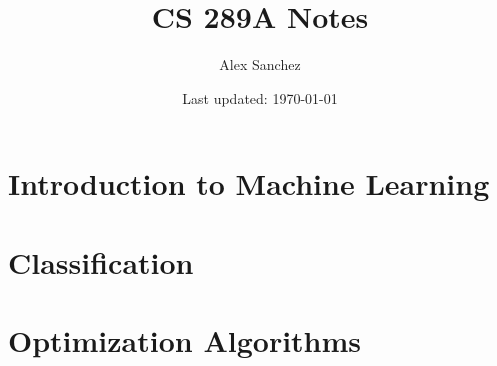 \documentclass[openany]{book}
\title{CS 289A Notes}
\author{Alex Sanchez}
\date{Last updated: \today}
\begin{document}
\maketitle

\tableofcontents

\chapter{Introduction to Machine Learning}


\chapter{Classification}


\chapter{Optimization Algorithms}

\end{document}
